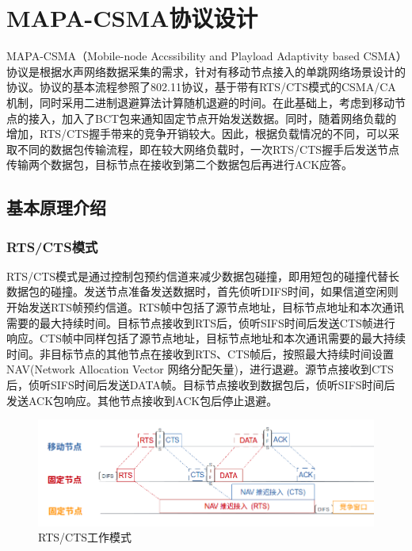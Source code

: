 \chapter{MAPA-CSMA协议设计}
MAPA-CSMA（Mobile-node Accssibility and Playload Adaptivity based CSMA）协议是根据水声网络数据采集的需求，针对有移动节点接入的单跳网络场景设计的协议。协议的基本流程参照了802.11协议，基于带有RTS/CTS模式的CSMA/CA机制，同时采用二进制退避算法计算随机退避的时间。在此基础上，考虑到移动节点的接入，加入了BCT包来通知固定节点开始发送数据。同时，随着网络负载的增加，RTS/CTS握手带来的竞争开销较大。因此，根据负载情况的不同，可以采取不同的数据包传输流程，即在较大网络负载时，一次RTS/CTS握手后发送节点传输两个数据包，目标节点在接收到第二个数据包后再进行ACK应答。

\section {基本原理介绍}
\subsection{RTS/CTS模式}
RTS/CTS模式是通过控制包预约信道来减少数据包碰撞，即用短包的碰撞代替长数据包的碰撞。发送节点准备发送数据时，首先侦听DIFS时间，如果信道空闲则开始发送RTS帧预约信道。RTS帧中包括了源节点地址，目标节点地址和本次通讯需要的最大持续时间。目标节点接收到RTS后，侦听SIFS时间后发送CTS帧进行响应。CTS帧中同样包括了源节点地址，目标节点地址和本次通讯需要的最大持续时间。非目标节点的其他节点在接收到RTS、CTS帧后，按照最大持续时间设置NAV(Network Allocation Vector 网络分配矢量)，进行退避。源节点接收到CTS后，侦听SIFS时间后发送DATA帧。目标节点接收到数据包后，侦听SIFS时间后发送ACK包响应。其他节点接收到ACK包后停止退避。
\begin{figure}[ht]
	\centering
	\includegraphics[scale=0.4]{figures/rtscts.png}
	\caption{
		RTS/CTS工作模式
	}
	\label{fig:example}
\end{figure}

